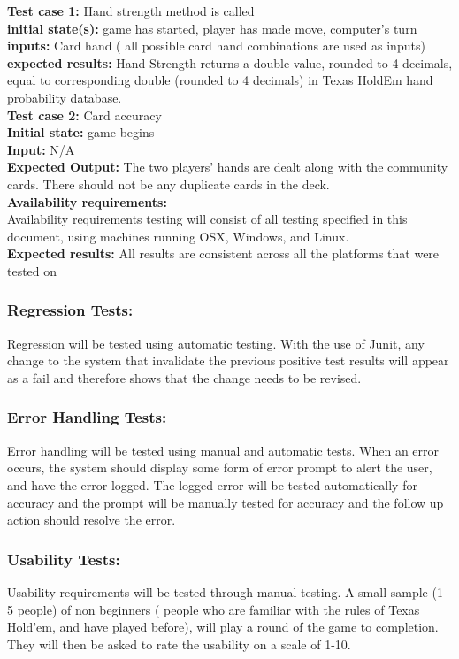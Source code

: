 \documentclass[12pt]{article}
\begin{document}
    \noindent \textbf{Test case 1:} Hand strength method is called\\
    \textbf{initial state(s):} game has started, player has made move, computer’s turn\\
    \textbf{inputs:} Card hand ( all possible card hand combinations are used as inputs)\\
    \textbf{expected results:} Hand Strength returns a double value, rounded to 4 decimals, equal
    to corresponding double (rounded to 4 decimals) in Texas HoldEm hand probability
    database.\\
    
    \noindent \textbf{Test case 2:} Card accuracy \\
    \textbf{Initial state:} game begins\\
    \textbf{Input:} N/A\\
    \textbf{Expected Output:} The two players’ hands are dealt along with the community cards. There should not be any duplicate cards in the deck. \\

	\noindent \textbf{Availability requirements:}\\
    Availability requirements testing will consist of all testing specified in this document,
using machines running OSX, Windows, and Linux.\\
    \textbf{Expected results:} All results are consistent across all the platforms that were tested on


\subsubsection*{Regression Tests:}
Regression will be tested using automatic testing. With the use of Junit, any change to the system that invalidate the previous positive test results will appear as a fail and therefore shows that the change needs to be revised.

\subsubsection*{Error Handling Tests:}
Error handling will be tested using manual and automatic tests. When an error occurs, the system should display some form of error prompt to alert the user, and have the error logged. The logged error will be tested automatically for accuracy and the prompt will be manually tested for accuracy and the follow up action should resolve the error. 

\subsubsection*{Usability Tests:}
Usability requirements will be tested through manual testing. A small sample (1-5 people) of non beginners ( people who are familiar with the rules of Texas Hold'em, and have played before), will play a round of the game to completion. They will then be asked to rate the usability on a scale of 1-10.
\end{document}
